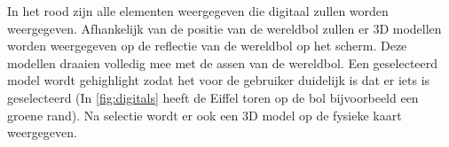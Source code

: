 In het rood zijn alle elementen weergegeven die digitaal zullen worden weergegeven. Afhankelijk van de positie van de wereldbol zullen er 3D modellen worden weergegeven op de reflectie van de wereldbol op het scherm. Deze modellen draaien volledig mee met de assen van de wereldbol. Een geselecteerd model wordt gehighlight zodat het voor de gebruiker duidelijk is dat er iets is geselecteerd (In \cref{fig:digitals} heeft de Eiffel toren op de bol bijvoorbeeld een groene rand). Na selectie wordt er ook een 3D model op de fysieke kaart weergegeven.